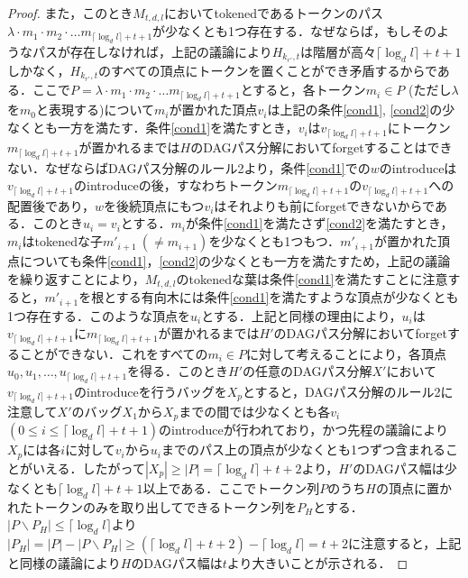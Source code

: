 \documentclass[master]{kuisthesis}		%
\theoremstyle{plain}
\theoremstyle{definition}
\begin{document}
\begin{proof}
    また，このとき$M_{t, d, l}$においてtokenedであるトークンのパス$\lambda \cdot m_1 \cdot m_2 \cdot \dots m_{\lceil \log_d l \rceil +t+1}$が少なくとも1つ存在する．なぜならば，もしそのようなパスが存在しなければ，上記の議論により$H_{k_{r'}, t}$は階層が高々$\lceil \log_d l \rceil +t+1$しかなく，$H_{k_{r'}, t}$のすべての頂点にトークンを置くことができ矛盾するからである．ここで$P = \lambda \cdot m_1 \cdot m_2 \cdot \dots m_{\lceil \log_d l \rceil +t+1}$とすると，各トークン$m_i \in P$ (ただし$\lambda$を$m_0$と表現する)について$m_i$が置かれた頂点$v_i$は上記の条件\ref{cond1}, \ref{cond2}の少なくとも一方を満たす．条件\ref{cond1}を満たすとき，$v_i$は$v_{\lceil \log_d l \rceil +t+1}$にトークン$m_{\lceil \log_d l \rceil +t+1}$が置かれるまでは$H$のDAGパス分解においてforgetすることはできない．なぜならばDAGパス分解のルール2より，条件\ref{cond1}での$w$のintroduceは$v_{\lceil \log_d l \rceil +t+1}$のintroduceの後，すなわちトークン$m_{\lceil \log_d l \rceil +t+1}$の$v_{\lceil \log_d l \rceil +t+1}$への配置後であり，$w$を後続頂点にもつ$v_i$はそれよりも前にforgetできないからである．このとき$u_i=v_i$とする．$m_i$が条件\ref{cond1}を満たさず\ref{cond2}を満たすとき，$m_i$はtokenedな子$m'_{i+1}\ (\neq m_{i+1})$を少なくとも1つもつ．$m'_{i+1}$が置かれた頂点についても条件\ref{cond1}，\ref{cond2}の少なくとも一方を満たすため，上記の議論を繰り返すことにより，$M_{t, d, l}$のtokenedな葉は条件\ref{cond1}を満たすことに注意すると，$m'_{i+1}$を根とする有向木には条件\ref{cond1}を満たすような頂点が少なくとも1つ存在する．このような頂点を$u_i$とする．上記と同様の理由により，$u_i$は$v_{\lceil \log_d l \rceil +t+1}$に$m_{\lceil \log_d l \rceil +t+1}$が置かれるまでは$H'$のDAGパス分解においてforgetすることができない．これをすべての$m_i \in P$に対して考えることにより，各頂点$u_0, u_1, \dots, u_{\lceil \log_d l \rceil +t+1}$を得る．このとき$H'$の任意のDAGパス分解$X'$において$v_{\lceil \log_d l \rceil +t+1}$のintroduceを行うバッグを$X_p$とすると，DAGパス分解のルール2に注意して$X'$のバッグ$X_1$から$X_p$までの間では少なくとも各$v_i$ $(0 \leq i \leq \lceil \log_d l \rceil +t+1)$のintroduceが行われており，かつ先程の議論により$X_p$には各$i$に対して$v_i$から$u_i$までのパス上の頂点が少なくとも1つずつ含まれることがいえる．したがって$|X_p| \geq |P| = \lceil \log_d l \rceil +t+2$より，$H'$のDAGパス幅は少なくとも$\lceil \log_d l \rceil +t+1$以上である．ここでトークン列$P$のうち$H$の頂点に置かれたトークンのみを取り出してできるトークン列を$P_H$とする．$|P \backslash P_H| \leq \lceil \log_d l \rceil$より$|P_H| = |P| - |P \backslash P_H| \geq (\lceil \log_d l \rceil +t+2) - \lceil \log_d l \rceil = t+2$に注意すると，上記と同様の議論により$H$のDAGパス幅は$t$より大きいことが示される．
\end{proof}
\end{document}
